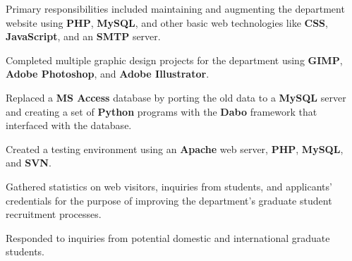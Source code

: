 


\begin{rExperience}

  \item Primary responsibilities included maintaining and augmenting the department website using \textbf{PHP}, \textbf{MySQL}, and other basic web technologies like \textbf{CSS}, \textbf{JavaScript}, and an \textbf{SMTP} server.

  \item Completed multiple graphic design projects for the department using \textbf{GIMP}, \textbf{Adobe Photoshop}, and \textbf{Adobe Illustrator}.

  \begin{CVonly}

  \item Replaced a \textbf{MS Access} database by porting the old data to a \textbf{MySQL} server and creating a set of \textbf{Python} programs with the \textbf{Dabo} framework that interfaced with the database.


  \item Created a testing environment using an \textbf{Apache} web server, \textbf{PHP}, \textbf{MySQL}, and \textbf{SVN}.

  \item Gathered statistics on web visitors, inquiries from students, and applicants' credentials for the purpose of improving the department's graduate student recruitment processes.

  \item Responded to inquiries from potential domestic and international graduate students.

  \end{CVonly}

\end{rExperience}
